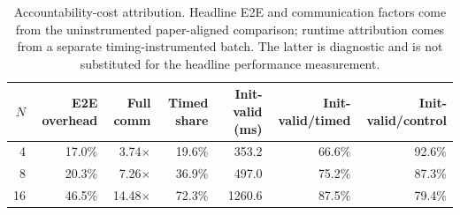\begin{table}[t]
\centering
\caption{Accountability-cost attribution. Headline E2E and communication factors come from the uninstrumented paper-aligned comparison; runtime attribution comes from a separate timing-instrumented batch. The latter is diagnostic and is not substituted for the headline performance measurement.}
\label{tab:pvia-cost-attribution}
\begin{tabular}{rrrrrrr}
\toprule
$N$ & E2E overhead & Full comm & Timed share & Init-valid (ms) & Init-valid/timed & Init-valid/control \\
\midrule
4 & 17.0\% & 3.74$\times$ & 19.6\% & 353.2 & 66.6\% & 92.6\% \\
8 & 20.3\% & 7.26$\times$ & 36.9\% & 497.0 & 75.2\% & 87.3\% \\
16 & 46.5\% & 14.48$\times$ & 72.3\% & 1260.6 & 87.5\% & 79.4\% \\
\bottomrule
\end{tabular}
\end{table}
